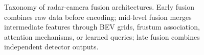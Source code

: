 \begin{figure}[t]
\centering

\caption{Taxonomy of radar-camera fusion architectures. Early fusion combines raw data before encoding; mid-level fusion merges intermediate features through BEV grids, frustum association, attention mechanisms, or learned queries; late fusion combines independent detector outputs.}
\label{fig:fusion_taxonomy}
\end{figure}
